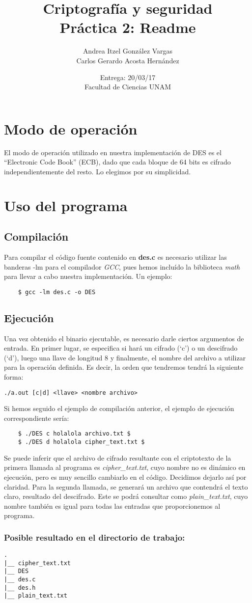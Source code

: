 \documentclass[12pt]{article}
\title{Criptografía y seguridad \\ Práctica 2: Readme}
\author{Andrea Itzel González Vargas \\ Carlos Gerardo Acosta Hernández}
\date{Entrega: 20/03/17 \\ Facultad de Ciencias UNAM}
\begin{document}
\maketitle
\section{Modo de operación}
El modo de operación utilizado en nuestra implementación de DES es el
``Electronic Code Book'' (ECB), dado que cada bloque de 64 bits es cifrado
independientemente del resto. Lo elegimos por su simplicidad.

\section{Uso del programa}
\subsection*{Compilación}
Para compilar el código fuente contenido en \textbf{des.c} es necesario
utilizar las banderas -lm para el compilador \textit{GCC}, pues hemos
incluído la biblioteca \textit{math} para llevar a cabo nuestra implementación. Un ejemplo:
\begin{verbatim}
    $ gcc -lm des.c -o DES
\end{verbatim}
\subsection*{Ejecución}
Una vez obtenido el binario ejecutable, es necesario darle ciertos
argumentos de entrada. En primer lugar, se especifica si hará un cifrado
(`c') o un descifrado (`d'), luego una llave de longitud 8 y finalmente, el nombre del archivo a utilizar para la operación definida. Es decir, la orden que tendremos tendrá la siguiente forma:
\begin{verbatim}
./a.out [c|d] <llave> <nombre archivo>
\end{verbatim}
Si hemos seguido el ejemplo de compilación anterior, el ejemplo de ejecución correspondiente sería:
\begin{verbatim}
    $ ./DES c holalola archivo.txt $
    $ ./DES d holalola cipher_text.txt $
\end{verbatim}

Se puede inferir que el archivo de cifrado resultante con el criptotexto
de la primera llamada al programa es \textit{cipher\_text.txt}, cuyo nombre no es dinámico
en ejecución, pero es muy sencillo cambiarlo en el código. Decidimos
dejarlo así por claridad.
Para la segunda llamada, se generará un archivo que contendrá el texto
claro, resultado del descifrado. Este se podrá consultar como \textit{plain\_text.txt}, cuyo nombre también es igual para todas las entradas que
proporcionemos al programa.

\subsubsection*{Posible resultado en el directorio de trabajo:}
\begin{verbatim}
.
|__ cipher_text.txt
|__ DES
|__ des.c
|__ des.h
|__ plain_text.txt

\end{verbatim}
\end{document}
